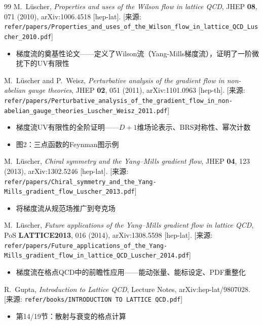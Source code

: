 \documentclass[12pt,a4paper]{ctexart}
\theoremstyle{definition}
\begin{document}
\begin{thebibliography}{99}
M.~L\"uscher,
\textit{Properties and uses of the Wilson flow in lattice QCD},
JHEP \textbf{08}, 071 (2010), arXiv:1006.4518 [hep-lat].
[来源: \texttt{refer/papers/Properties\_and\_uses\_of\_the\_Wilson\_flow\_in\_lattice\_QCD\_Luscher\_2010.pdf}]
\begin{itemize}
    \item 梯度流的奠基性论文——定义了Wilson流（Yang-Mills梯度流），证明了一阶微扰下的UV有限性
\end{itemize}

M.~L\"uscher and P.~Weisz,
\textit{Perturbative analysis of the gradient flow in non-abelian gauge theories},
JHEP \textbf{02}, 051 (2011), arXiv:1101.0963 [hep-th].
[来源: \texttt{refer/papers/Perturbative\_analysis\_of\_the\_gradient\_flow\_in\_non-abelian\_gauge\_theories\_Luscher\_Weisz\_2011.pdf}]
\begin{itemize}
    \item 梯度流UV有限性的全阶证明——$D+1$维场论表示、BRS对称性、幂次计数
    \item 图2：三点函数的Feynman图示例
\end{itemize}

M.~L\"uscher,
\textit{Chiral symmetry and the Yang--Mills gradient flow},
JHEP \textbf{04}, 123 (2013), arXiv:1302.5246 [hep-lat].
[来源: \texttt{refer/papers/Chiral\_symmetry\_and\_the\_Yang-Mills\_gradient\_flow\_Luscher\_2013.pdf}]
\begin{itemize}
    \item 将梯度流从规范场推广到夸克场
\end{itemize}

M.~L\"uscher,
\textit{Future applications of the Yang--Mills gradient flow in lattice QCD},
PoS \textbf{LATTICE2013}, 016 (2014), arXiv:1308.5598 [hep-lat].
[来源: \texttt{refer/papers/Future\_applications\_of\_the\_Yang-Mills\_gradient\_flow\_in\_lattice\_QCD\_Luscher\_2014.pdf}]
\begin{itemize}
    \item 梯度流在格点QCD中的前瞻性应用——能动张量、能标设定、PDF重整化
\end{itemize}

R.~Gupta,
\textit{Introduction to Lattice QCD},
Lecture Notes, arXiv:hep-lat/9807028.
[来源: \texttt{refer/books/INTRODUCTION TO LATTICE QCD.pdf}]
\begin{itemize}
    \item 第14/19节：散射与衰变的格点计算
\end{itemize}


\end{thebibliography}
\end{document}
